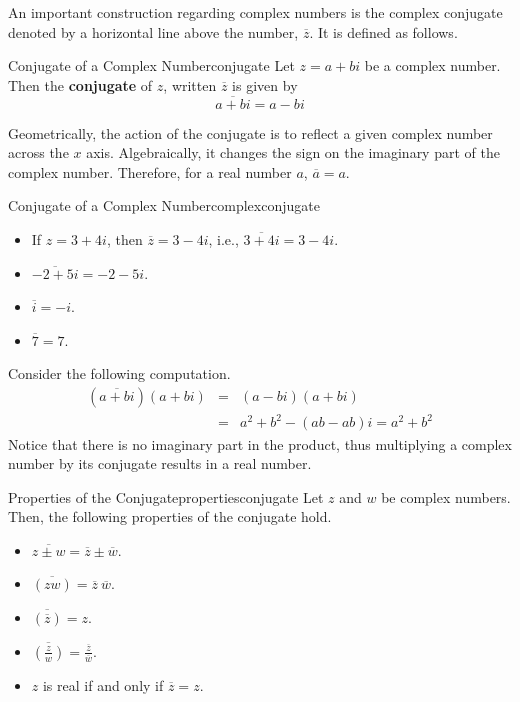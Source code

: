 An important construction regarding complex numbers is the complex
conjugate
denoted by a horizontal line above the number, $\overline{z}$. It
is defined as follows.

\begin{definition}{Conjugate of a Complex Number}{conjugate}
Let $z = a+bi$ be a complex number. Then the \textbf{conjugate} of $z$, written $\overline{z}$ is given by 
\begin{equation*}
\overline{a+bi}= a-bi
\end{equation*}
\end{definition}

Geometrically, the action of the conjugate is to reflect a given complex number across the $x$ axis.
Algebraically, it changes the sign on the imaginary part of the complex number. Therefore, for a real number $a$, $\overline{a} = a$. 

\begin{example}{Conjugate of a Complex Number}{complexconjugate}
\begin{itemize}

\item If $z=3+4i$, then $\overline{z}=3-4i$,
i.e., $\overline{3+4i}=3-4i$.

\item $\overline{-2+5i}= -2-5i$.

\item $\overline{i}= -i$.

\item $\overline{7}= 7$.
\end{itemize}
\end{example}

Consider the following computation. 
\begin{eqnarray*}
\left( \overline{a+bi}\right) \left( a+bi\right) &=&\left( a-bi\right)
\left( a+bi\right) \\
&=&a^{2}+b^{2}-\left( ab-ab\right)i =a^{2}+b^{2}
\end{eqnarray*}
Notice that there is no imaginary part in the product, thus
multiplying a complex number by its conjugate results in  a real number.

\begin{theorem}{Properties of the Conjugate}{propertiesconjugate}
Let $z$ and $w$ be complex numbers. Then, the following properties of the conjugate hold.

\begin{itemize}
\item
$\overline{z\pm w} = \overline{z} \pm \overline{w}$.
\item
$\overline{(zw)} = \overline{z}~ \overline{w}$.
\item
$\overline{(\overline{z})}=z$.
\item
$\overline{\left(\frac{z}{w}\right)} =
\frac{\overline{z}}{\overline{w}}$.
\item
$z$ is real if and only if $\overline{z}=z$.
\end{itemize}
\end{theorem}

